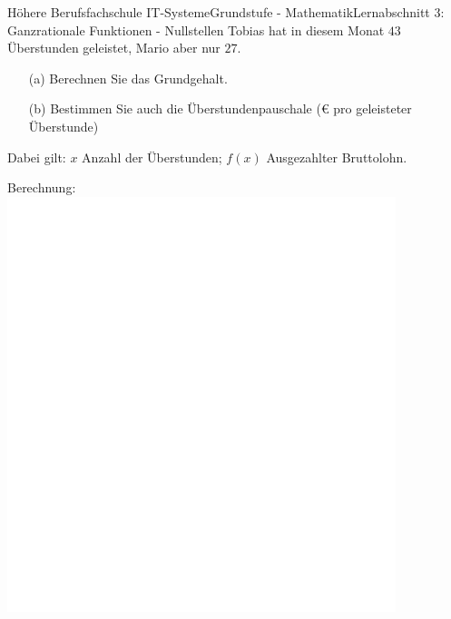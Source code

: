 \documentclass[oneside,openany,headings=optiontotoc,11pt,numbers=noenddot]{scrreprt}
\begin{document}
\begin{worksheet}{Höhere Berufsfachschule IT-Systeme}{Grundstufe - Mathematik}{Lernabschnitt 3: Ganzrationale Funktionen - Nullstellen}
		Tobias hat in diesem Monat \(43\) Überstunden geleistet, Mario aber nur \(27\).\\
		\begin{itemize}
			\item[(a)] Berechnen Sie das Grundgehalt.
			\item[(b)] Bestimmen Sie auch die Überstundenpauschale (\euro{} pro geleisteter Überstunde)
		\end{itemize}
		\small{Dabei gilt: \(x\) Anzahl der Überstunden; \(f(x)\) Ausgezahlter Bruttolohn.}
		\begin{framed}
			\noindent
			\small{\color{codegray}Berechnung:}\\
			\includegraphics[width=0.85\textwidth]{../../empty.jpg}\\
		\end{framed}
	\end{worksheet}
\end{document}
